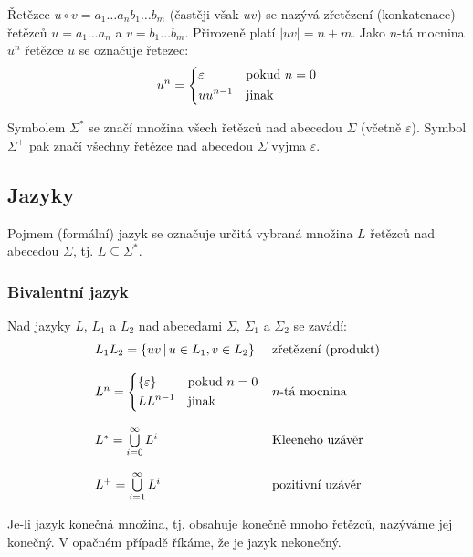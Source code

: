 \documentclass[a4paper,10pt]{article}
\begin{document}
Řetězec $u \circ v = a_1 \dots a_n b_1 \dots b_m$ (častěji však $uv$) se nazývá zřetězení (konkatenace) řetězců $u = a_1 \dots a_n$ a $v = b_1 \dots b_m$. Přirozeně platí $|uv| = n + m$. Jako $n$-tá mocnina $u^n$ řetězce $u$ se označuje řetezec:
$$
  u^n = \begin{dcases}
    \varepsilon & \text{pokud } n = 0\\
    u u^{n-1} & \text{jinak}
  \end{dcases}
$$

Symbolem $\Sigma^*$ se značí množina všech řetězců nad abecedou $\Sigma$ (včetně $\varepsilon$). Symbol $\Sigma^+$ pak značí všechny řetězce nad abecedou $\Sigma$ vyjma $\varepsilon$. %

\subsection{Jazyky}

Pojmem (formální) jazyk se označuje určitá vybraná množina $L$ řetězců nad abecedou $\Sigma$, tj. $L \subseteq \Sigma^*$.

\subsubsection*{Bivalentní jazyk}
Nad jazyky $L$, $L_1$ a $L_2$ nad abecedami $\Sigma$, $\Sigma_1$ a $\Sigma_2$ se zavádí:
$$
\begin{array}{ll}
  L_1 L_2 		= \left\{ u v \,|\, u \in L_1, v \in L_2 \right\}	& \text{zřetězení (produkt)}	\\ \\
  L^n 			= \begin{dcases}
      \left\{ \varepsilon \right\} 	& \text{pokud } n = 0 \\
      L L^{n-1} 			& \text{jinak}
    \end{dcases} 								& \text{$n$-tá mocnina}		\\ \\
  
  L^* 	= \bigcup\limits_{i=0}^{\infty} L^i						& \text{Kleeneho uzávěr}	\\ \\
  L^+ 	= \bigcup\limits_{i=1}^{\infty} L^i						& \text{pozitivní uzávěr}
\end{array}
$$

Je-li jazyk konečná množina, tj, obsahuje konečně mnoho řetězců, nazýváme jej konečný. V opačném případě říkáme, že je jazyk nekonečný.
\end{document}
